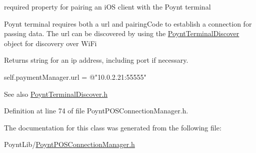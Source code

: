 required property for pairing an i\+OS client with the Poynt terminal 

Poynt terminal requires both a url and pairing\+Code to establish a connection for passing data. The url can be discovered by using the \hyperlink{interface_poynt_terminal_discover}{Poynt\+Terminal\+Discover} object for discovery over Wi\+Fi

\begin{DoxyReturn}{Returns}
string for an ip address, including port if necessary.
\end{DoxyReturn}

\begin{DoxyCode}
\textcolor{keyword}{self}.paymentManager.url = \textcolor{stringliteral}{@"10.0.2.21:55555"}
\end{DoxyCode}


\begin{DoxySeeAlso}{See also}
\hyperlink{_poynt_terminal_discover_8h}{Poynt\+Terminal\+Discover.\+h} 
\end{DoxySeeAlso}


Definition at line 74 of file Poynt\+P\+O\+S\+Connection\+Manager.\+h.



The documentation for this class was generated from the following file\+:\begin{DoxyCompactItemize}
\item 
Poynt\+Lib/\hyperlink{_poynt_p_o_s_connection_manager_8h}{Poynt\+P\+O\+S\+Connection\+Manager.\+h}\end{DoxyCompactItemize}
